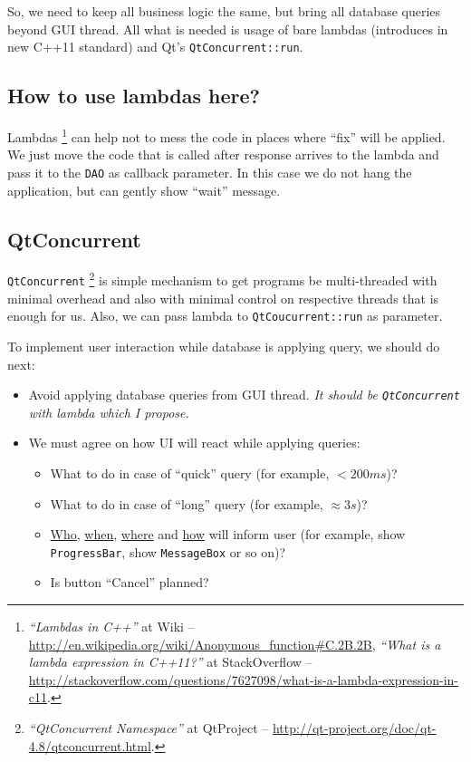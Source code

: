 \documentclass[a4paper,12pt]{scrartcl}
\begin{document}
So, we need to keep all business logic the same, but bring all database queries beyond GUI thread. All what is needed is usage of bare lambdas (introduces in new C++11 standard) and Qt's \texttt{QtConcurrent::run}.

\subsection{How to use lambdas here?}

Lambdas%
\footnote{\textit{``Lambdas in C++''} at Wiki -- 
\url{http://en.wikipedia.org/wiki/Anonymous\_function\#C.2B.2B}, 
\textit{``What is a lambda expression in C++11?''} at StackOverflow -- 
\url{http://stackoverflow.com/questions/7627098/what-is-a-lambda-expression-in-c11}.}
can help not to mess the code in places where ``fix'' will be applied. We just move the code that is called after response arrives to the lambda and pass it to the \texttt{DAO} as callback parameter. In this case we do not hang the application, but can gently show ``wait'' message. 


\subsection{QtConcurrent}
\texttt{QtConcurrent}%
\footnote{\textit{``QtConcurrent Namespace''} at QtProject -- \url{http://qt-project.org/doc/qt-4.8/qtconcurrent.html}.}
is simple mechanism to get programs be multi-threaded with minimal overhead and also with minimal control on respective threads that is enough for us. Also, we can pass lambda to \texttt{QtCoucurrent::run} as parameter.

To implement user interaction while database is applying query, we should do next:
\begin{itemize}
 \item Avoid applying database queries from GUI thread. \textit{It should be \texttt{QtConcurrent} with lambda which I propose.}
 \item We must agree on how UI will react while applying queries:
 \begin{itemize}
  \item What to do in case of ``quick'' query (for example, $< 200 ms$)?
  \item What to do in case of ``long'' query (for example, $\approx 3 s$)?
  \item \underline{Who}, \underline{when}, \underline{where} and \underline{how} will inform user (for example, show \texttt{ProgressBar}, show \texttt{MessageBox} or so on)?
  \item Is button ``Cancel'' planned?
 \end{itemize}
\end{itemize}
\end{document}
